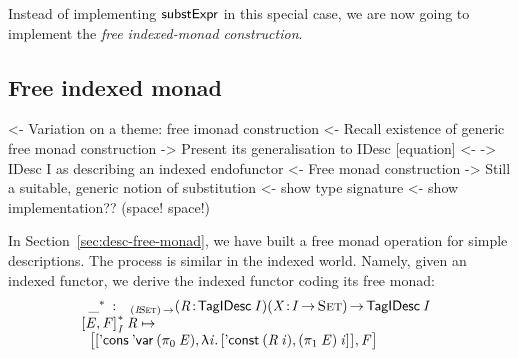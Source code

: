 Instead of implementing $\substH$ in this special case, we are now
going to implement the \emph{free indexed-monad construction}.

\subsection{Free indexed monad}

\begin{wstructure}
<- Variation on a theme: free imonad construction
    <- Recall existence of generic free monad construction
    -> Present its generalisation to IDesc [equation]
        <- \I -> IDesc I as describing an indexed endofunctor
        <- Free monad construction
    -> Still a suitable, generic notion of substitution
        <- show type signature
        <- show implementation?? (space! space!)
\end{wstructure}

In Section~\ref{sec:desc-free-monad}, we have built a free monad
operation for simple descriptions. The process is similar in the
indexed world. Namely, given an indexed functor, we derive the indexed
functor coding its free monad: 
%
\[\stk{
\begin{array}{ll}
\FreeIMonad{\_}{} : & _{\PI{\V{I}}{\Set}}
                     \PITEL{\V{R}}{\TagIDesc{\V{I}}} 
                     \PITEL{\V{X}}{\V{I} \To \Set}\To 
                      \TagIDesc{\V{I}}
\end{array} \\
\FreeIMonad{\pair{\V{E}}{\V{F}}{}}{\V{I}}{\V{R}} \mapsto \\ \;\;
    \pair{\pair{\ListCons{\SYMBDVar}{(\fst{\V{E}})}} 
               {\LAM{\V{i}}
                \pair{\DConst{(\V{R}\: \V{i})}}
                     {(\snd{\V{E}})\: \V{i}}{}}{}}
         {\V{F}}{}
}\]


\newcommand{\substI}{\F{substI}}



